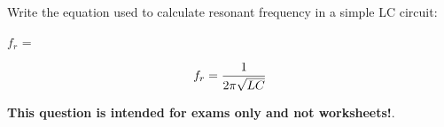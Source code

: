 

Write the equation used to calculate resonant frequency in a simple LC circuit:

\vskip 10pt

$f_r$ = 







$$f_r = {1 \over {2 \pi \sqrt{LC}}}$$







{\bf This question is intended for exams only and not worksheets!}.



